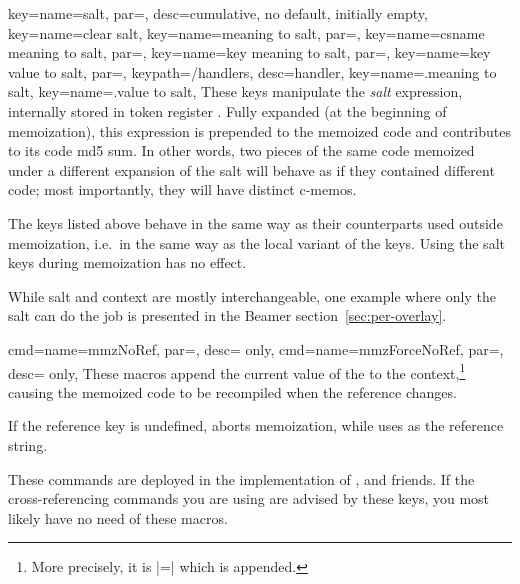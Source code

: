 \documentclass[a4paper,11pt]{article}
\begin{document}
\begin{doc}{
    key={name=salt, par=, desc={cumulative, no default,
        initially empty}},
    key={name=clear salt},
    key={name=meaning to salt,
      par=},
    key={name=csname meaning to salt, par=},
    key={name=key meaning to salt,
      par=},
    key={name=key value to salt,
      par=},
    keypath={/handlers}, desc=handler,
    key={name=.meaning to salt},
    key={name=.value to salt},
  }
  These keys manipulate the \emph{salt} expression, internally stored in token
  register .  Fully expanded (at the beginning of
  memoization), this expression is prepended to the memoized code and
  contributes to its code md5 sum.  In other words, two pieces of the same code
  memoized under a different expansion of the salt will behave as if they
  contained different code; most importantly, they will have distinct c-memos.
  
  The keys listed above behave in the same way as their 
  counterparts used outside memoization, i.e.\ in the same way as the local
  variant of the  keys.  Using the salt keys during memoization
  has no effect.

  While salt and context are mostly interchangeable, one example where only the
  salt can do the job is presented in the Beamer section~\ref{sec:per-overlay}.
\end{doc}

\begin{doc}{
    cmd={name=mmzNoRef, par=, desc= only},
    cmd={name=mmzForceNoRef, par=, desc= only},
  }
  These macros append the current value of the  to the
  context,\footnote{More precisely, it is |=| which is appended.}  causing the memoized code to be recompiled
  when the reference changes.

  If the reference key is undefined,  aborts memoization,
  while  uses  as the reference string.

  These commands are deployed in the implementation of ,  and friends.  If the
  cross-referencing commands you are using are advised by these keys, you most
  likely have no need of these macros.
\end{doc}
\end{document}
